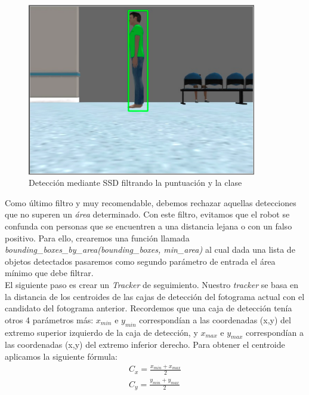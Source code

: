 \begin{figure} [H]
  \begin{center}
    \includegraphics[width=10cm]{imagenes/cap6/deteccion-ssd-filtro-score-class.png}
  \end{center}
  \caption[Detección mediante SSD filtrando la puntuación y la clase]{Detección mediante SSD filtrando la puntuación y la clase}
  \label{fig:deteccion_ssd_filtro_score_class}
\end{figure}

Como último filtro y muy recomendable, debemos rechazar aquellas detecciones que no superen un \textit{área} determinado. Con este filtro, evitamos que el robot se confunda con personas que se encuentren a una distancia lejana o con un falso positivo. Para ello, crearemos una función llamada \textit{bounding\_boxes\_by\_area(bounding\_boxes, min\_area)} al cual dada una lista de objetos detectados pasaremos como segundo parámetro de entrada el área mínimo que debe filtrar.\\

El siguiente paso es crear un \textit{Tracker} de seguimiento. Nuestro \textit{tracker} se basa en la distancia de los centroides de las cajas de detección del fotograma actual con el candidato del fotograma anterior. Recordemos que una caja de detección tenía otros 4 parámetros más: $x_{min}$ e $y_{min}$ correspondían a las coordenadas (x,y) del extremo superior izquierdo de la caja de detección, y $x_{max}$ e $y_{max}$ correspondían a las coordenadas (x,y) del extremo inferior derecho. Para obtener el centroide aplicamos la siguiente fórmula:\\
\begin{eqnarray*}
C_x = \frac{x_{min} + x_{max}}{2}\\
C_y = \frac{y_{min} + y_{max}}{2}\\
\end{eqnarray*}

